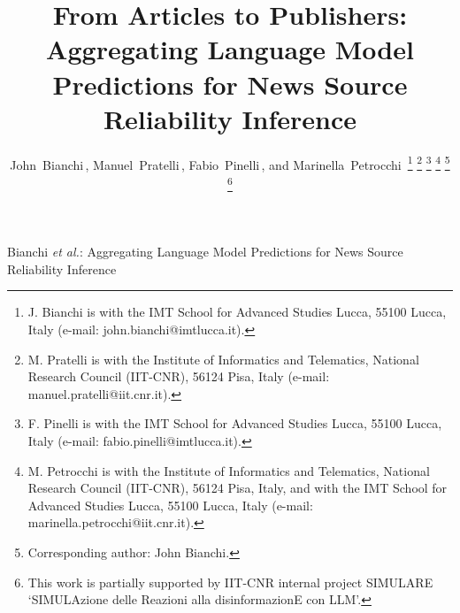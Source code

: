 \documentclass[journal]{IEEEtran}
\begin{document}
\title{From Articles to Publishers: Aggregating Language Model Predictions for News Source Reliability Inference}

\author{John~Bianchi\,,
        Manuel~Pratelli\,,
        Fabio~Pinelli\,,
        and Marinella~Petrocchi\,%
\thanks{J. Bianchi is with the IMT School for Advanced Studies Lucca, 55100 Lucca, Italy (e-mail: john.bianchi@imtlucca.it).}%
\thanks{M. Pratelli is with the Institute of Informatics and Telematics, National Research Council (IIT-CNR), 56124 Pisa, Italy (e-mail: manuel.pratelli@iit.cnr.it).}%
\thanks{F. Pinelli is with the IMT School for Advanced Studies Lucca, 55100 Lucca, Italy (e-mail: fabio.pinelli@imtlucca.it).}%
\thanks{M. Petrocchi is with the Institute of Informatics and Telematics, National Research Council (IIT-CNR), 56124 Pisa, Italy, and with the IMT School for Advanced Studies Lucca, 55100 Lucca, Italy (e-mail: marinella.petrocchi@iit.cnr.it).}%
\thanks{Corresponding author: John Bianchi.}%
\thanks{This work is partially supported by IIT-CNR internal project SIMULARE `SIMULAzione delle Reazioni alla disinformazionE con LLM'.}%
}

%
{Bianchi \MakeLowercase{\textit{et al.}}: Aggregating Language Model Predictions for News Source Reliability Inference}

\maketitle
\end{document}
